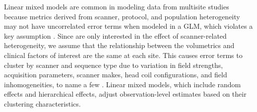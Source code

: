 Linear mixed models are common in modeling data from multisite studies because metrics derived from scanner, protocol, and population heterogeneity may not have uncorrelated error terms when modeled in a GLM, which violates a key assumption \cite{garson2013fundamentals}. Since are only interested in the effect of scanner-related heterogeneity, we assume that the relationship between the volumetrics and clinical factors of interest are the same at each site. This causes error terms to cluster by scanner and sequence type due to variation in field strengths, acquisition parameters, scanner makes, head coil configurations, and field inhomogeneities, to name a few \cite{cannon2014}. Linear mixed models, which include random effects and hierarchical effects, adjust observation-level estimates based on their clustering characteristics\cite{garson2013fundamentals}.